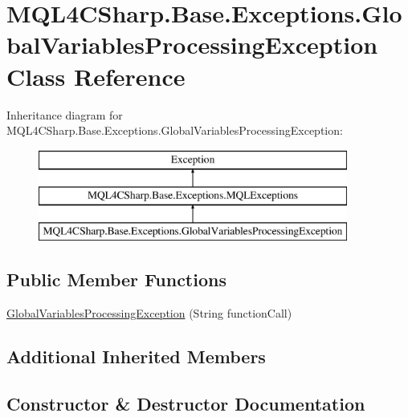 \hypertarget{class_m_q_l4_c_sharp_1_1_base_1_1_exceptions_1_1_global_variables_processing_exception}{}\section{M\+Q\+L4\+C\+Sharp.\+Base.\+Exceptions.\+Global\+Variables\+Processing\+Exception Class Reference}
\label{class_m_q_l4_c_sharp_1_1_base_1_1_exceptions_1_1_global_variables_processing_exception}
Inheritance diagram for M\+Q\+L4\+C\+Sharp.\+Base.\+Exceptions.\+Global\+Variables\+Processing\+Exception\+:\begin{figure}[H]
\begin{center}
\leavevmode
\includegraphics[height=3.000000cm]{class_m_q_l4_c_sharp_1_1_base_1_1_exceptions_1_1_global_variables_processing_exception}
\end{center}
\end{figure}
\subsection*{Public Member Functions}
\begin{DoxyCompactItemize}
\item 
\hyperlink{class_m_q_l4_c_sharp_1_1_base_1_1_exceptions_1_1_global_variables_processing_exception_a207d4f1def1f6a8a53ed982047905f4f}{Global\+Variables\+Processing\+Exception} (String function\+Call)
\end{DoxyCompactItemize}
\subsection*{Additional Inherited Members}


\subsection{Constructor \& Destructor Documentation}
